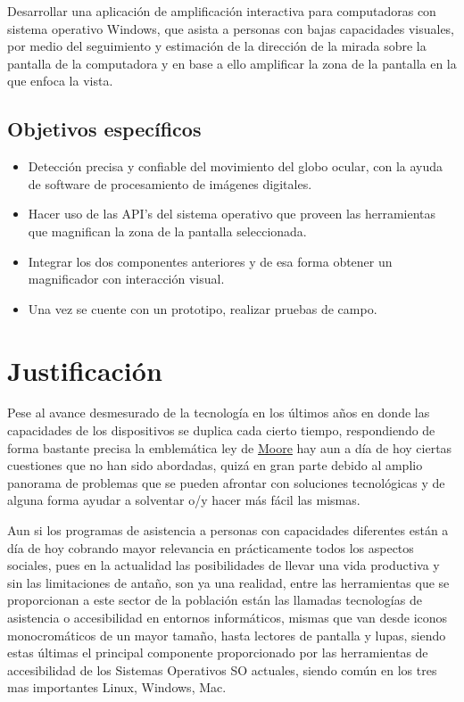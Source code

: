\documentclass[12pt]{book} %
\begin{document}
		Desarrollar una aplicación de amplificación interactiva para computadoras con sistema operativo Windows, 
		que asista a personas con bajas capacidades visuales, por medio del seguimiento y estimación de la dirección 
		de la mirada sobre la pantalla de la computadora y en base a ello amplificar la zona de la pantalla en la 
		que enfoca la vista.
	
	\subsection{Objetivos específicos}
		\begin{itemize}
			\item Detección precisa y confiable del movimiento del globo ocular, con la ayuda de software de 
			procesamiento de imágenes digitales.
			\item Hacer uso de las API’s del sistema operativo que proveen las herramientas que magnifican la zona de
			la pantalla seleccionada.
			\item Integrar los dos componentes anteriores y de esa forma obtener un magnificador con interacción visual.
			\item Una vez se cuente con un prototipo, realizar pruebas de campo.
		\end{itemize}
		

\newpage
\section{Justificación}
	Pese al avance desmesurado de la tecnología en los últimos años en donde las capacidades de los dispositivos se
	duplica cada cierto tiempo, respondiendo de forma bastante precisa la emblemática ley de 
	\href{https://en.wikipedia.org/wiki/Moore's_law}{Moore} hay aun a día de hoy
	ciertas cuestiones que no han sido abordadas, quizá en gran parte debido al amplio panorama de problemas que se
	pueden afrontar con soluciones tecnológicas y de alguna forma ayudar a solventar o/y hacer más fácil las mismas.
	
	Aun si los programas de asistencia a personas con capacidades diferentes están a día de hoy cobrando mayor 			  	
	relevancia en prácticamente todos los aspectos sociales, pues en la actualidad las posibilidades de llevar una vida
	productiva y sin las limitaciones de antaño, son ya una realidad, entre las herramientas que se proporcionan a este
	sector de la población están las llamadas tecnologías de asistencia o accesibilidad en entornos informáticos, mismas
	que van desde iconos monocromáticos de un mayor tamaño, hasta lectores de pantalla y lupas, siendo estas últimas el
	principal componente proporcionado por las herramientas de accesibilidad de los Sistemas Operativos \gls{SO} actuales,
	siendo común en los tres mas importantes \gls{Linux}, \gls{Windows}, \gls{Mac}.
	
\end{document}
